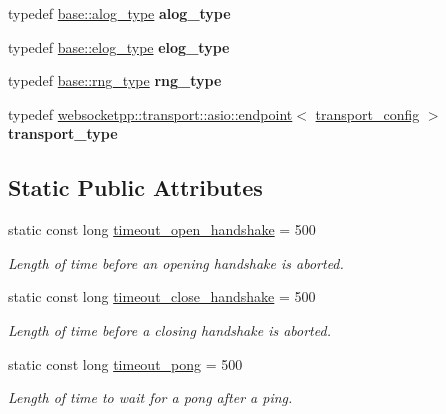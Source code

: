\begin{DoxyCompactItemize}
\item 
\mbox{\label{structconfig__tls_a9e0a6c6a2f7f1b7ec5182b6af5b84395}} 
typedef \mbox{\hyperlink{classwebsocketpp_1_1log_1_1basic}{base\+::alog\+\_\+type}} {\bfseries alog\+\_\+type}
\item 
\mbox{\label{structconfig__tls_af8e2db18d805b737336c66ae8e387ebf}} 
typedef \mbox{\hyperlink{classwebsocketpp_1_1log_1_1basic}{base\+::elog\+\_\+type}} {\bfseries elog\+\_\+type}
\item 
\mbox{\label{structconfig__tls_a7dd19da184abbffd3a0ac31b92ea3d07}} 
typedef \mbox{\hyperlink{classwebsocketpp_1_1random_1_1none_1_1int__generator}{base\+::rng\+\_\+type}} {\bfseries rng\+\_\+type}
\item 
\mbox{\label{structconfig__tls_a0b80a63406ce688a82a966f69a2de6f5}} 
typedef \mbox{\hyperlink{classwebsocketpp_1_1transport_1_1asio_1_1endpoint}{websocketpp\+::transport\+::asio\+::endpoint}}$<$ \mbox{\hyperlink{structconfig__tls_1_1transport__config}{transport\+\_\+config}} $>$ {\bfseries transport\+\_\+type}
\end{DoxyCompactItemize}
\subsection*{Static Public Attributes}
\begin{DoxyCompactItemize}
\item 
\mbox{\label{structconfig__tls_a0c6b3960fc997f92c8d9e57a1e9a6f7f}} 
static const long \mbox{\hyperlink{structconfig__tls_a0c6b3960fc997f92c8d9e57a1e9a6f7f}{timeout\+\_\+open\+\_\+handshake}} = 500
\begin{DoxyCompactList}\small\item\em Length of time before an opening handshake is aborted. \end{DoxyCompactList}\item 
\mbox{\label{structconfig__tls_a6739e7cd1bcb205eafe4031253c1dffc}} 
static const long \mbox{\hyperlink{structconfig__tls_a6739e7cd1bcb205eafe4031253c1dffc}{timeout\+\_\+close\+\_\+handshake}} = 500
\begin{DoxyCompactList}\small\item\em Length of time before a closing handshake is aborted. \end{DoxyCompactList}\item 
\mbox{\label{structconfig__tls_af0898008c9b8e2218f6bea1da15a0297}} 
static const long \mbox{\hyperlink{structconfig__tls_af0898008c9b8e2218f6bea1da15a0297}{timeout\+\_\+pong}} = 500
\begin{DoxyCompactList}\small\item\em Length of time to wait for a pong after a ping. \end{DoxyCompactList}\end{DoxyCompactItemize}


